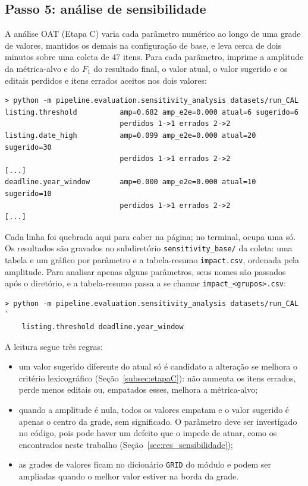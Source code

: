\subsection{Passo 5: análise de sensibilidade}

A análise OAT (Etapa C) varia cada parâmetro numérico ao longo de uma grade de
valores, mantidos os demais na configuração de base, e leva cerca de dois
minutos sobre uma coleta de 47 itens. Para cada parâmetro, imprime a amplitude
da métrica-alvo e do $F_1$ do resultado final, o valor atual, o valor sugerido e
os editais perdidos e itens errados aceitos nos dois valores:

\begin{footnotesize}
\begin{verbatim}
> python -m pipeline.evaluation.sensitivity_analysis datasets/run_CAL
listing.threshold          amp=0.682 amp_e2e=0.000 atual=6 sugerido=6
                           perdidos 1->1 errados 2->2
listing.date_high          amp=0.099 amp_e2e=0.000 atual=20 sugerido=30
                           perdidos 1->1 errados 2->2
[...]
deadline.year_window       amp=0.000 amp_e2e=0.000 atual=10 sugerido=10
                           perdidos 1->1 errados 2->2
[...]
\end{verbatim}
\end{footnotesize}

Cada linha foi quebrada aqui para caber na página; no terminal, ocupa uma só.
Os resultados são gravados no subdiretório \texttt{sensitivity\_base/} da
coleta: uma tabela e um gráfico por parâmetro e a tabela-resumo
\texttt{impact.csv}, ordenada pela amplitude. Para analisar apenas alguns
parâmetros, seus nomes são passados após o diretório, e a tabela-resumo passa a
se chamar \texttt{impact\_<grupos>.csv}:

\begin{footnotesize}
\begin{verbatim}
> python -m pipeline.evaluation.sensitivity_analysis datasets/run_CAL `
    listing.threshold deadline.year_window
\end{verbatim}
\end{footnotesize}

A leitura segue três regras:

\begin{itemize}
  \item um valor sugerido diferente do atual só é candidato a alteração se
    melhora o critério lexicográfico (Seção~\ref{subsec:etapaC}): não aumenta
    os itens errados, perde menos editais ou, empatados esses, melhora a
    métrica-alvo;
  \item quando a amplitude é nula, todos os valores empatam e o valor sugerido
    é apenas o centro da grade, sem significado. O parâmetro deve ser
    investigado no código, pois pode haver um defeito que o impede de atuar,
    como os encontrados neste trabalho (Seção~\ref{sec:res_sensibilidade});
  \item as grades de valores ficam no dicionário \texttt{GRID} do módulo e
    podem ser ampliadas quando o melhor valor estiver na borda da grade.
\end{itemize}


